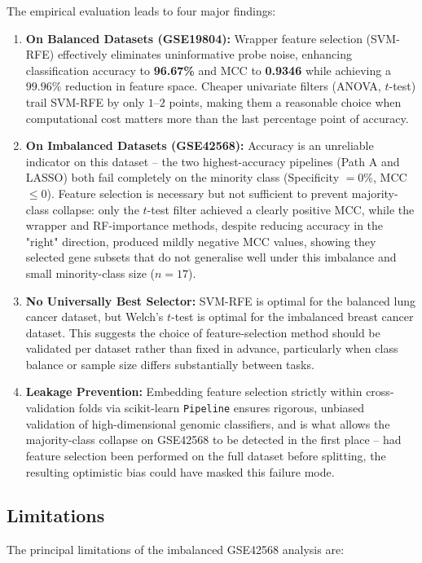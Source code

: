 The empirical evaluation leads to four major findings:
\begin{enumerate}
    \item \textbf{On Balanced Datasets (GSE19804):} Wrapper feature selection (SVM-RFE) effectively eliminates uninformative probe noise, enhancing classification accuracy to \textbf{96.67\%} and MCC to \textbf{0.9346} while achieving a $99.96\%$ reduction in feature space. Cheaper univariate filters (ANOVA, $t$-test) trail SVM-RFE by only $1$--$2$ points, making them a reasonable choice when computational cost matters more than the last percentage point of accuracy.
    \item \textbf{On Imbalanced Datasets (GSE42568):} Accuracy is an unreliable indicator on this dataset -- the two highest-accuracy pipelines (Path A and LASSO) both fail completely on the minority class (Specificity $=0\%$, MCC $\le 0$). Feature selection is necessary but not sufficient to prevent majority-class collapse: only the $t$-test filter achieved a clearly positive MCC, while the wrapper and RF-importance methods, despite reducing accuracy in the "right" direction, produced mildly negative MCC values, showing they selected gene subsets that do not generalise well under this imbalance and small minority-class size ($n=17$).
    \item \textbf{No Universally Best Selector:} SVM-RFE is optimal for the balanced lung cancer dataset, but Welch's $t$-test is optimal for the imbalanced breast cancer dataset. This suggests the choice of feature-selection method should be validated per dataset rather than fixed in advance, particularly when class balance or sample size differs substantially between tasks.
    \item \textbf{Leakage Prevention:} Embedding feature selection strictly within cross-validation folds via scikit-learn \texttt{Pipeline} ensures rigorous, unbiased validation of high-dimensional genomic classifiers, and is what allows the majority-class collapse on GSE42568 to be detected in the first place -- had feature selection been performed on the full dataset before splitting, the resulting optimistic bias could have masked this failure mode.
\end{enumerate}

\subsection{Limitations}

The principal limitations of the imbalanced GSE42568 analysis are:

